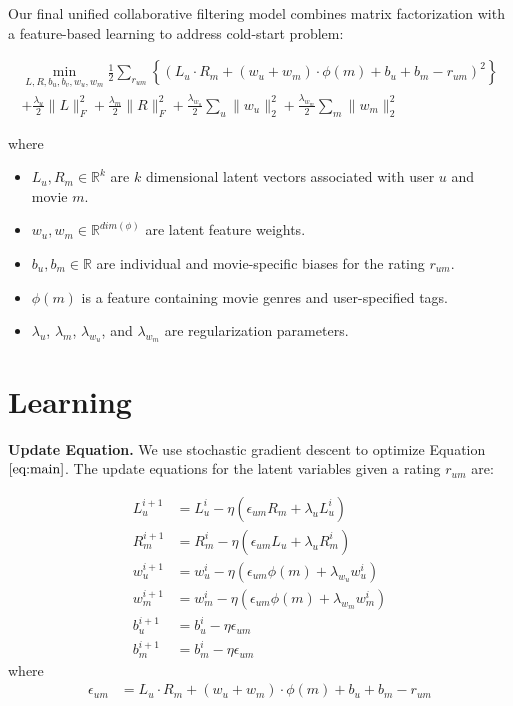 \documentclass{article} %
\begin{document}
Our final unified collaborative filtering model combines matrix
factorization with a feature-based learning to address cold-start problem:

\begin{multline}
\min_{L, R, b_u, b_v, w_u, w_m} \frac{1}{2}\sum_{r_{um}} \left\{(L_u \cdot R_m + (w_u + w_m) \cdot \phi(m) + b_u + b_m - r_{um})^2\right\}\\ + \frac{\lambda_u}{2}\|L\|^2_F + \frac{\lambda_m}{2}\|R\|^2_F + \frac{\lambda_{w_u}}{2}\sum_u\|w_u\|^2_2 + \frac{\lambda_{w_m}}{2}\sum_m\|w_m\|^2_2\label{eq:main}
\end{multline}

where
\begin{itemize}
	\item $L_u, R_m \in \mathbb{R}^k$ are $k$ dimensional latent vectors associated with user $u$ and movie $m$.
	\item $w_u,w_m \in \mathbb{R}^{dim(\phi)}$ are latent feature weights.
	\item $b_u, b_m \in \mathbb{R}$ are individual and movie-specific biases for the rating $r_{um}$.
	\item $\phi(m)$ is a feature containing movie genres and user-specified tags.
	\item $\lambda_u$, $\lambda_m$, $\lambda_{w_u}$, and $\lambda_{w_m}$ are regularization parameters.
\end{itemize}

\section{Learning}

\textbf{Update Equation.}   We use stochastic gradient descent to optimize
Equation $\ref{eq:main}$. The update equations for the latent variables given
a rating $r_{um}$ are:

\begin{align}
L_u^{i+1} &= L_u^{i} - \eta ( \epsilon_{um} R_m  + \lambda_u L_u^i) \label{eq:update1st}\\
R_m^{i+1} &= R_m^{i} - \eta ( \epsilon_{um} L_u  + \lambda_u R_m^i)\\
w_u^{i+1} &= w_u^{i} - \eta ( \epsilon_{um} \phi(m) + \lambda_{w_u} w_u^i)\\
w_m^{i+1} &= w_m^{i} - \eta ( \epsilon_{um} \phi(m) + \lambda_{w_m} w_m^i)\\
b_u^{i+1} &= b_u^{i} - \eta \epsilon_{um}\\
b_m^{i+1} &= b_m^{i} - \eta \epsilon_{um} \label{eq:updatelast}
\end{align}
where
\begin{align}
	\epsilon_{um} &= L_u \cdot R_m + (w_u + w_m) \cdot \phi(m) + b_u + b_m - r_{um}
\end{align}
\end{document}
